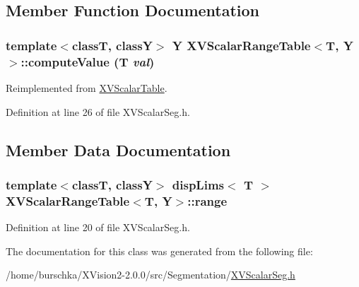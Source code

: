 \subsection{Member Function Documentation}
\label{XVScalarRangeTable_a2}
\hypertarget{class_XVScalarRangeTable_a2}{
\subsubsection[computeValue]{\setlength{\rightskip}{0pt plus 5cm}template$<$classT, classY$>$ Y XVScalar\-Range\-Table$<$T, Y$>$::compute\-Value (T {\em val})}}




Reimplemented from \hyperlink{class_XVScalarTable}{XVScalar\-Table}.

Definition at line 26 of file XVScalar\-Seg.h.

\subsection{Member Data Documentation}
\label{XVScalarRangeTable_o0}
\hypertarget{class_XVScalarRangeTable_o0}{
\subsubsection[range]{\setlength{\rightskip}{0pt plus 5cm}template$<$classT, classY$>$ disp\-Lims$<$ T $>$ XVScalar\-Range\-Table$<$T, Y$>$::range}}




Definition at line 20 of file XVScalar\-Seg.h.

The documentation for this class was generated from the following file:\begin{CompactItemize}
\item 
/home/burschka/XVision2-2.0.0/src/Segmentation/\hyperlink{XVScalarSeg.h-source}{XVScalar\-Seg.h}\end{CompactItemize}
